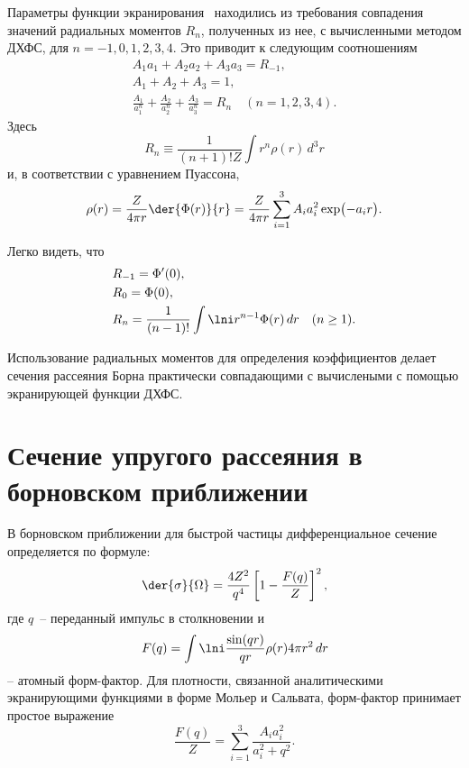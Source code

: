   Параметры функции экранирования~ находились из
  требования совпадения значений радиальных моментов \( R_n \),
  полученных из нее, с вычисленными методом ДХФС, для
  \( n = -1, 0, 1, 2, 3, 4 \). Это приводит к следующим соотношениям
  \begin{gather}
    A_1 a_1 + A_2 a_2 + A_3 a_3 = R_{-1}, \nonumber \\
    A_1 + A_2 + A_3 = 1, \label{eq:Salvat15} \\
    \frac{A_1}{a_1^n} + \frac{A_2}{a_2^n} + \frac{A_3}{a_3^n} =
      R_n \quad (n = 1,2,3,4). \nonumber
  \end{gather}
  Здесь
  \[
    R_n \equiv \frac{1}{(n + 1)!Z}\int r^n \rho(r)\,d^3r
  \]
  и, в соответствии с уравнением Пуассона,
  \begin{equation}
    \rho(r) = \frac{Z}{4\pi r} \der{\Phi(r)}{r} = \frac{Z}{4\pi r}
      \sum\limits_{i = 1}^3 A_i a_i^2 \exp\bigl(-a_ir\big).
    \label{eq:Poisson}
  \end{equation}

  Легко видеть, что
  \begin{align*}
    & R_{-1} = \Phi'(0), \\
    & R_0 = \Phi (0), \\
    & R_n = \frac{1}{(n - 1)!} \int\lni r^{n - 1} \Phi(r)\,dr \quad (n \geq 1).
  \end{align*}

  Использование радиальных моментов для определения коэффициентов
  делает сечения рассеяния Борна практически совпадающими с
  вычислеными с помощью экранирующей функции ДХФС.

  \section{Сечение упругого рассеяния в борновском приближении}

  В борновском приближении для быстрой частицы дифференциальное
  сечение определяется по формуле:
  \begin{equation}
    \der{\sigma}{\Omega} = \frac{4Z^2}{q^4}
      \left[ 1 - \frac{F(q)}{Z} \right]^2,
    \label{eq:diff}
  \end{equation}
  где \( q \)~-- переданный импульс в столкновении и
  \[
    F(q) = \int\lni \frac{\sin(qr)}{qr} \rho(r) 4\pi r^2\,dr
  \]
  -- атомный форм-фактор. Для плотности, связанной аналитическими
  экранирующими функциями в форме Мольер и Сальвата, форм-фактор
  принимает простое выражение
  \begin{equation}
    \frac{F(q)}{Z} = \sum_{i=1}^3 \frac{A_ia_i^2}{a_i^2 + q^2}.
    \label{eq:factor}
  \end{equation}

